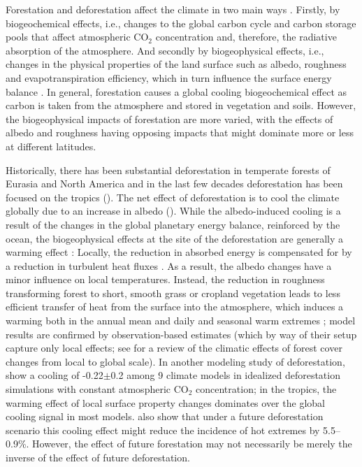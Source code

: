 \documentclass[]{article}
\begin{document}
Forestation and deforestation affect the climate in two main ways \parencite{pongratz_biogeophysical_2010,ito_biogeophysical_2020,zhu_comparable_2023}.
Firstly, by biogeochemical effects, i.e., changes to the global carbon cycle and carbon storage pools that affect atmospheric CO$_2$ concentration and, therefore, the radiative absorption of the atmosphere.
And secondly by biogeophysical effects, i.e., changes in the physical properties of the land surface such as albedo, roughness and evapotranspiration efficiency, which in turn influence the surface energy balance \parencite{betts_offset_2000,bala_combined_2007,winckler_importance_2019}.
In general, forestation causes a global cooling biogeochemical effect as carbon is taken from the atmosphere and stored in vegetation and soils.
However, the biogeophysical impacts of forestation are more varied, with the effects of albedo and roughness having opposing impacts that might dominate more or less at different latitudes.

Historically, there has been substantial deforestation in temperate forests of Eurasia and North America and in the last few decades deforestation has been focused on the tropics (\cite{goldewijk_estimating_2001}).
The net effect of deforestation is to cool the climate globally due to an increase in albedo (\cite{davin_climatic_2010}).
While the albedo-induced cooling is a result of the changes in the global planetary energy balance, reinforced by the ocean, the biogeophysical effects at the site of the deforestation are generally a warming effect \parencite{winckler_nonlocal_2019}: Locally, the reduction in absorbed energy is compensated for by a reduction in turbulent heat fluxes \parencite{winckler_importance_2019}.
As a result, the albedo changes have a minor influence on local temperatures.
Instead, the reduction in roughness transforming forest to short, smooth grass or cropland vegetation leads to less efficient transfer of heat from the surface into the atmosphere, which induces a warming both in the annual mean and daily and seasonal warm extremes \parencite{winckler_different_2019}; model results are confirmed by observation-based estimates (which by way of their setup capture only local effects;  \parencite{alkama_biophysical_2016,bright_local_2017} see \cite{pongratz_land_2021} for a review of the climatic effects of forest cover changes from local to global scale).
In another modeling study of deforestation, \cite{boysen_global_2020} show a cooling of -0.22$\pm$0.2 \textcelsius{} among 9 climate models in idealized deforestation simulations with constant atmospheric CO$_2$ concentration; in the tropics, the warming effect of local surface property changes dominates over the global cooling signal in most models.
\cite{hong_impacts_2022} also show that under a future deforestation scenario this cooling effect might reduce the incidence of hot extremes by 5.5--0.9\%.
However, the effect of future forestation may not necessarily be merely the inverse of the effect of future deforestation.
\end{document}
